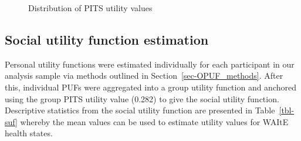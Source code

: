 \documentclass[
  number,
  preprint]{elsarticle}
\begin{document}
\begin{figure}


\caption{\label{fig-hist}Distribution of PITS utility values}

\end{figure}%

\subsection{Social utility function
estimation}\label{social-utility-function-estimation}

Personal utility functions were estimated individually for each
participant in our analysis sample via methods outlined in
Section~\ref{sec-OPUF_methods}. After this, individual PUFs were
aggregated into a group utility function and anchored using the group
PITS utility value (0.282) to give the social utility function.
Descriptive statistics from the social utility function are presented in
Table~\ref{tbl-suf} whereby the mean values can be used to estimate
utility values for WAItE health states.
\end{document}
